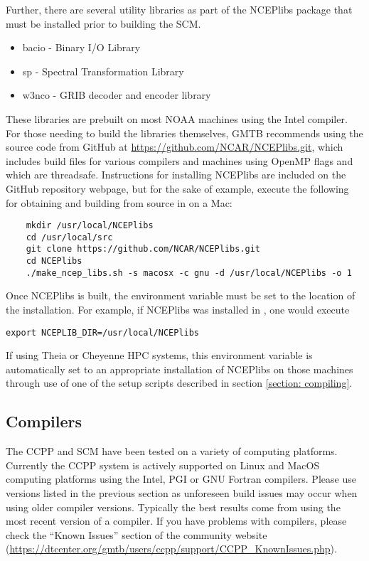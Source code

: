Further, there are several utility libraries as part of the NCEPlibs package that must be installed prior to building the SCM. 
\begin{itemize}
    \item bacio - Binary I/O Library
    \item sp - Spectral Transformation Library
    \item w3nco - GRIB decoder and encoder library
\end{itemize}
These libraries are prebuilt on most NOAA machines using the Intel compiler. For those needing to build the libraries themselves, GMTB recommends using the source code from GitHub at \url{https://github.com/NCAR/NCEPlibs.git}, which includes build files for various compilers and machines using OpenMP flags and which are threadsafe. Instructions for installing NCEPlibs are included on the GitHub repository webpage, but for the sake of example, execute the following for obtaining and building from source in  on a Mac:
\begin{lstlisting}
    mkdir /usr/local/NCEPlibs
    cd /usr/local/src
    git clone https://github.com/NCAR/NCEPlibs.git
    cd NCEPlibs
    ./make_ncep_libs.sh -s macosx -c gnu -d /usr/local/NCEPlibs -o 1
\end{lstlisting}
Once NCEPlibs is built, the  environment variable must be set to the location of the installation. For example, if NCEPlibs was installed in , one would execute
\begin{lstlisting}
export NCEPLIB_DIR=/usr/local/NCEPlibs
\end{lstlisting}
If using Theia or Cheyenne HPC systems, this environment variable is automatically set to an appropriate installation of NCEPlibs on those machines through use of one of the setup scripts described in section \ref{section: compiling}.


\subsection{Compilers}
The CCPP and SCM have been tested on a variety of
computing platforms. Currently the CCPP system is actively supported
on Linux and MacOS computing platforms using the Intel, PGI or GNU Fortran
compilers. Please use versions listed in the previous section as unforeseen
build issues may occur when using older compiler versions. Typically the best results come from using the
most recent version of a compiler. If you have problems with compilers, please check the ``Known Issues'' section of the
community website (\url{https://dtcenter.org/gmtb/users/ccpp/support/CCPP_KnownIssues.php}).


